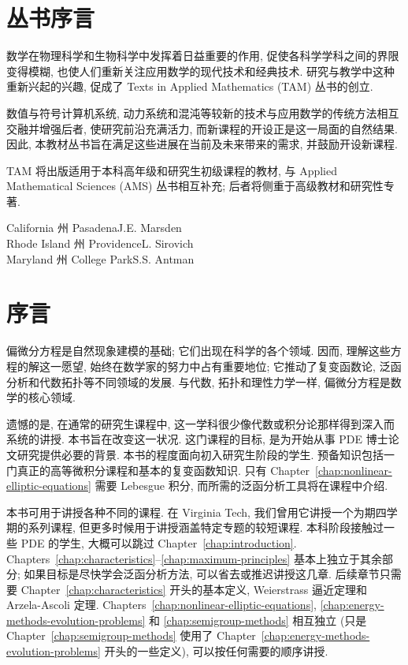 \clearpage\section*{丛书序言}\label{sec:series-preface}

数学在物理科学和生物科学中发挥着日益重要的作用, 促使各科学学科之间的界限变得模糊, 也使人们重新关注应用数学的现代技术和经典技术. 研究与教学中这种重新兴起的兴趣, 促成了 Texts in Applied Mathematics (TAM) 丛书的创立.

数值与符号计算机系统, 动力系统和混沌等较新的技术与应用数学的传统方法相互交融并增强后者, 使研究前沿充满活力, 而新课程的开设正是这一局面的自然结果. 因此, 本教材丛书旨在满足这些进展在当前及未来带来的需求, 并鼓励开设新课程.

TAM 将出版适用于本科高年级和研究生初级课程的教材, 与 Applied Mathematical Sciences (AMS) 丛书相互补充; 后者将侧重于高级教材和研究性专著.

\begin{flushright}California 州 Pasadena\hfill J.E. Marsden\\Rhode Island 州 Providence\hfill L. Sirovich\\Maryland 州 College Park\hfill S.S. Antman\end{flushright}

\clearpage\section*{序言}\label{sec:author-preface}

偏微分方程是自然现象建模的基础; 它们出现在科学的各个领域. 因而, 理解这些方程的解这一愿望, 始终在数学家的努力中占有重要地位; 它推动了复变函数论, 泛函分析和代数拓扑等不同领域的发展. 与代数, 拓扑和理性力学一样, 偏微分方程是数学的核心领域.

遗憾的是, 在通常的研究生课程中, 这一学科很少像代数或积分论那样得到深入而系统的讲授. 本书旨在改变这一状况. 这门课程的目标, 是为开始从事 PDE 博士论文研究提供必要的背景. 本书的程度面向初入研究生阶段的学生. 预备知识包括一门真正的高等微积分课程和基本的复变函数知识. 只有 Chapter~\ref{chap:nonlinear-elliptic-equations} 需要 Lebesgue 积分, 而所需的泛函分析工具将在课程中介绍.

本书可用于讲授各种不同的课程. 在 Virginia Tech, 我们曾用它讲授一个为期四学期的系列课程, 但更多时候用于讲授涵盖特定专题的较短课程. 本科阶段接触过一些 PDE 的学生, 大概可以跳过 Chapter~\ref{chap:introduction}. Chapters~\ref{chap:characteristics}--\ref{chap:maximum-principles} 基本上独立于其余部分; 如果目标是尽快学会泛函分析方法, 可以省去或推迟讲授这几章. 后续章节只需要 Chapter~\ref{chap:characteristics} 开头的基本定义, Weierstrass 逼近定理和 Arzela-Ascoli 定理. Chapters~\ref{chap:nonlinear-elliptic-equations}, \ref{chap:energy-methods-evolution-problems} 和 \ref{chap:semigroup-methods} 相互独立 (只是 Chapter~\ref{chap:semigroup-methods} 使用了 Chapter~\ref{chap:energy-methods-evolution-problems} 开头的一些定义), 可以按任何需要的顺序讲授.

